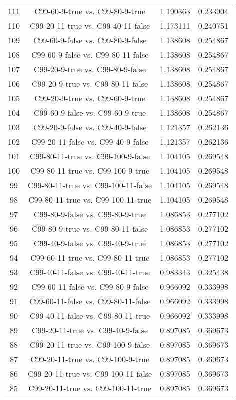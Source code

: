 \documentclass[a4paper,10pt]{article}
\begin{document}
\begin{landscape}
\begin{table}[!htp]
\begin{tabular}{cccc}
111&C99-60-9-true vs. C99-80-9-true&1.190363&0.233904\\
110&C99-20-11-true vs. C99-40-11-false&1.173111&0.240751\\
109&C99-60-9-false vs. C99-80-9-false&1.138608&0.254867\\
108&C99-60-9-false vs. C99-80-11-false&1.138608&0.254867\\
107&C99-20-9-true vs. C99-80-9-false&1.138608&0.254867\\
106&C99-20-9-true vs. C99-80-11-false&1.138608&0.254867\\
105&C99-20-9-true vs. C99-60-9-true&1.138608&0.254867\\
104&C99-60-9-false vs. C99-60-9-true&1.138608&0.254867\\
103&C99-20-9-false vs. C99-40-9-false&1.121357&0.262136\\
102&C99-20-11-false vs. C99-40-9-false&1.121357&0.262136\\
101&C99-80-11-true vs. C99-100-9-false&1.104105&0.269548\\
100&C99-80-11-true vs. C99-100-9-true&1.104105&0.269548\\
99&C99-80-11-true vs. C99-100-11-false&1.104105&0.269548\\
98&C99-80-11-true vs. C99-100-11-true&1.104105&0.269548\\
97&C99-80-9-false vs. C99-80-9-true&1.086853&0.277102\\
96&C99-80-9-true vs. C99-80-11-false&1.086853&0.277102\\
95&C99-40-9-false vs. C99-40-9-true&1.086853&0.277102\\
94&C99-60-11-true vs. C99-80-11-true&1.086853&0.277102\\
93&C99-40-11-false vs. C99-40-11-true&0.983343&0.325438\\
92&C99-60-11-false vs. C99-80-9-false&0.966092&0.333998\\
91&C99-60-11-false vs. C99-80-11-false&0.966092&0.333998\\
90&C99-40-11-false vs. C99-80-11-true&0.966092&0.333998\\
89&C99-20-11-true vs. C99-40-9-false&0.897085&0.369673\\
88&C99-20-11-true vs. C99-100-9-false&0.897085&0.369673\\
87&C99-20-11-true vs. C99-100-9-true&0.897085&0.369673\\
86&C99-20-11-true vs. C99-100-11-false&0.897085&0.369673\\
85&C99-20-11-true vs. C99-100-11-true&0.897085&0.369673\\

\end{tabular}
\end{table}
\end{landscape}
\end{document}
